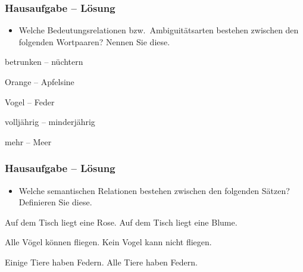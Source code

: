 
\begin{frame}
\frametitle{Hausaufgabe -- Lösung}

\begin{itemize}
\item Welche Bedeutungsrelationen bzw.\ Ambiguitätsarten bestehen zwischen den folgenden Wortpaaren? Nennen Sie diese.
\end{itemize}

\eal 
	\ex betrunken -- nüchtern \pause 
	\hfill {}
	
	\ex Orange -- Apfelsine \pause 
	\hfill {}
	
	\ex Vogel -- Feder \pause 
	\hfill {}
	
	
	\ex volljährig -- minderjährig \pause 
	\hfill {}
	
	\ex mehr -- Meer \pause 
	\hfill {}
	
\zl 

\end{frame}


\begin{frame}
	\frametitle{Hausaufgabe -- Lösung}
	
	\begin{itemize}
		\item Welche semantischen Relationen bestehen zwischen den folgenden Sätzen? Definieren Sie diese.
	\end{itemize}
	
	\eal 
	\ex Auf dem Tisch liegt eine Rose.
	\ex Auf dem Tisch liegt eine Blume.
	\zl
	\pause 
	
	\hfill {}
	
	
	\pause 
	
	\eal 	
	\ex Alle Vögel können fliegen.
	\ex Kein Vogel kann nicht fliegen.
	\zl
	\pause 
	
	\hfill {}
	
	\pause 
	
	\eal 	
	\ex Einige Tiere haben Federn.
	\ex Alle Tiere haben Federn.
	\zl
	\pause 
	
	\hfill {}
	
\end{frame}

